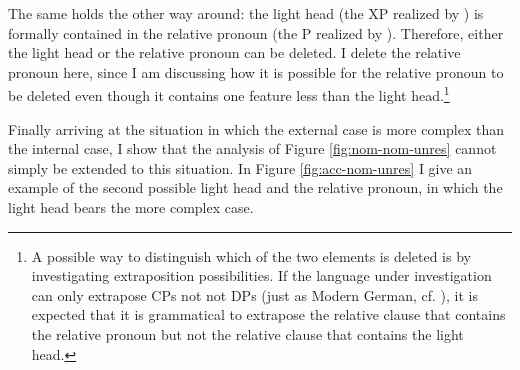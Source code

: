 The same holds the other way around: the light head (the XP realized by ) is formally contained in the relative pronoun (the P realized by ). Therefore, either the light head or the relative pronoun can be deleted. I delete the relative pronoun here, since I am discussing how it is possible for the relative pronoun to be deleted even though it contains one feature less than the light head.\footnote{A possible way to distinguish which of the two elements is deleted is by investigating extraposition possibilities. If the language under investigation can only extrapose CPs not not DPs (just as Modern German, cf. \citealt{vanriemsdijk2006}), it is expected that it is grammatical to extrapose the relative clause that contains the relative pronoun but not the relative clause that contains the light head.}

Finally arriving at the situation in which the external case is more complex than the internal case, I show that the analysis of Figure \ref{fig:nom-nom-unres} cannot simply be extended to this situation.
In Figure \ref{fig:acc-nom-unres} I give an example of the second possible light head and the relative pronoun, in which the light head bears the more complex case.

